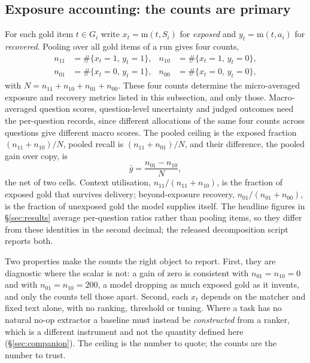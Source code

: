 \documentclass[10pt,twocolumn]{article}
\begin{document}
\subsection{Exposure accounting: the counts are primary}\label{sec:accounting}
For each gold item $t\in G_i$ write $x_t=\mathrm{m}(t,S_i)$ for \emph{exposed} and $y_t=\mathrm{m}(t,a_i)$ for \emph{recovered}. Pooling over all gold items of a run gives four counts,
\[
\begin{aligned}
  n_{11}&=\#\{x_t{=}1,\,y_t{=}1\}, & n_{10}&=\#\{x_t{=}1,\,y_t{=}0\},\\
  n_{01}&=\#\{x_t{=}0,\,y_t{=}1\}, & n_{00}&=\#\{x_t{=}0,\,y_t{=}0\},
\end{aligned}
\]
with $N=n_{11}+n_{10}+n_{01}+n_{00}$. These four counts determine the micro-averaged exposure and recovery metrics listed in this subsection, and only those. Macro-averaged question scores, question-level uncertainty and judged outcomes need the per-question records, since different allocations of the same four counts across questions give different macro scores. The pooled ceiling is the exposed fraction $(n_{11}+n_{10})/N$, pooled recall is $(n_{11}+n_{01})/N$, and their difference, the pooled gain over copy, is
\[
  \bar g=\frac{n_{01}-n_{10}}{N},
\]
the net of two cells. Context utilisation, $n_{11}/(n_{11}+n_{10})$, is the fraction of exposed gold that survives delivery; beyond-exposure recovery, $n_{01}/(n_{01}+n_{00})$, is the fraction of unexposed gold the model supplies itself. The headline figures in \S\ref{sec:results} average per-question ratios rather than pooling items, so they differ from these identities in the second decimal; the released decomposition script reports both.

Two properties make the counts the right object to report. First, they are diagnostic where the scalar is not: a gain of zero is consistent with $n_{01}=n_{10}=0$ and with $n_{01}=n_{10}=200$, a model dropping as much exposed gold as it invents, and only the counts tell those apart. Second, each $x_t$ depends on the matcher and fixed text alone, with no ranking, threshold or tuning. Where a task has no natural no-op extractor a baseline must instead be \emph{constructed} from a ranker, which is a different instrument and not the quantity defined here (\S\ref{sec:companion}). The ceiling is the number to quote; the counts are the number to trust.
\end{document}
